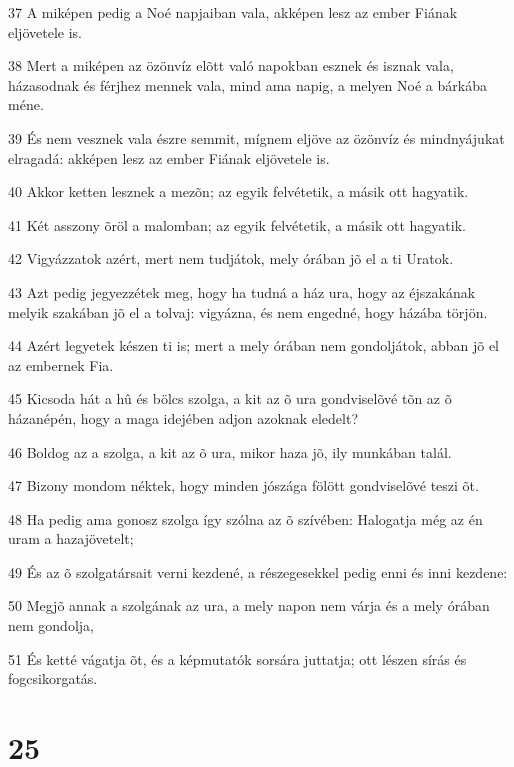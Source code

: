 \par 37 A miképen pedig a Noé napjaiban vala, akképen lesz az ember Fiának eljövetele is.
\par 38 Mert a miképen az özönvíz elõtt való napokban esznek és isznak vala, házasodnak és férjhez mennek vala, mind ama napig, a melyen Noé a bárkába méne.
\par 39 És nem vesznek vala észre semmit, mígnem eljöve az özönvíz és mindnyájukat elragadá: akképen lesz az ember Fiának eljövetele is.
\par 40 Akkor ketten lesznek a mezõn; az egyik felvétetik, a másik ott hagyatik.
\par 41 Két asszony õröl a malomban; az egyik felvétetik, a másik ott hagyatik.
\par 42 Vigyázzatok azért, mert nem tudjátok, mely órában jõ el a ti Uratok.
\par 43 Azt pedig jegyezzétek meg, hogy ha tudná a ház ura, hogy az éjszakának melyik szakában jõ el a tolvaj: vigyázna, és nem engedné, hogy házába törjön.
\par 44 Azért legyetek készen ti is; mert a mely órában nem gondoljátok, abban jõ el az embernek Fia.
\par 45 Kicsoda hát a hû és bölcs szolga, a kit az õ ura gondviselõvé tõn az õ házanépén, hogy a maga idejében adjon azoknak eledelt?
\par 46 Boldog az a szolga, a kit az õ ura, mikor haza jõ, ily munkában talál.
\par 47 Bizony mondom néktek, hogy minden jószága fölött gondviselõvé teszi õt.
\par 48 Ha pedig ama gonosz szolga így szólna az õ szívében: Halogatja még az én uram a hazajövetelt;
\par 49 És az õ szolgatársait verni kezdené, a részegesekkel pedig enni és inni kezdene:
\par 50 Megjõ annak a szolgának az ura, a mely napon nem várja és a mely órában nem gondolja,
\par 51 És ketté vágatja õt, és a képmutatók sorsára juttatja; ott lészen sírás és fogcsikorgatás.

\chapter{25}

